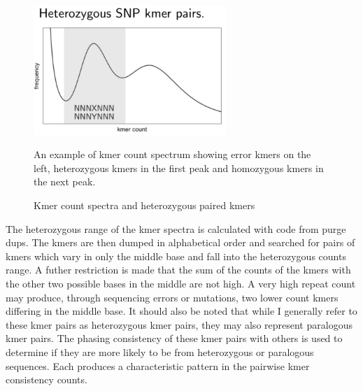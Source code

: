 \begin{figure}[htbp!]

\caption{Kmer count spectra and heterozygous paired kmers}
\label{figure:kmc}
\begin{centering}
\includegraphics[width=0.65\textwidth]{kmc.png}
\par{An example of kmer count spectrum showing error kmers on the left, heterozygous kmers in the first peak and homozygous kmers in the next peak.}
\end{centering}
\end{figure}

\par{
The heterozygous range of the kmer spectra is calculated with code from purge dups\cite{purgedups}. The kmers are then dumped in alphabetical order and searched for pairs of kmers which vary in only the middle base and fall into the heterozygous counts range. A futher restriction is made that the sum of the counts of the kmers with the other two possible bases in the middle are not high. A very high repeat count may produce, through sequencing errors or mutations, two lower count kmers differing in the middle base. It should also be noted that while I generally refer to these kmer pairs as heterozygous kmer pairs, they may also represent paralogous kmer pairs. The phasing consistency of these kmer pairs with others is used to determine if they are more likely to be from heterozygous or paralogous sequences. Each produces a characteristic pattern in the pairwise kmer consistency counts.
}

